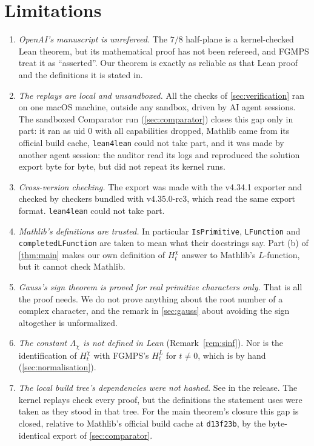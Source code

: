 \documentclass[11pt]{article}
\theoremstyle{definition}
\newcommand{\lean}[1]{\texttt{#1}}
\newcommand{\Lc}{\Lambda}
\begin{document}
\section{Limitations}\label{sec:limits}

\begin{enumerate}
\item \emph{OpenAI's manuscript is unrefereed.} The $7/8$ half-plane is a kernel-checked Lean theorem, but its mathematical proof has not been refereed, and FGMPS treat it as ``asserted''. Our theorem is exactly as reliable as that Lean proof and the definitions it is stated in.
\item \emph{The replays are local and unsandboxed.} All the checks of \cref{sec:verification} ran on one macOS machine, outside any sandbox, driven by AI agent sessions. The sandboxed Comparator run (\cref{sec:comparator}) closes this gap only in part: it ran as uid 0 with all capabilities dropped, Mathlib came from its official build cache, \lean{lean4lean} could not take part, and it was made by another agent session: the auditor read its logs and reproduced the solution export byte for byte, but did not repeat its kernel runs.
\item \emph{Cross-version checking.} The export was made with the v4.34.1 exporter and checked by checkers bundled with v4.35.0-rc3, which read the same export format. \lean{lean4lean} could not take part.
\item \emph{Mathlib's definitions are trusted.} In particular \lean{IsPrimitive}, \lean{LFunction} and \lean{completedLFunction} are taken to mean what their docstrings say. Part (b) of \cref{thm:main} makes our own definition of $H^\chi_t$ answer to Mathlib's $L$-function, but it cannot check Mathlib.
\item \emph{Gauss's sign theorem is proved for real primitive characters only.} That is all the proof needs. We do not prove anything about the root number of a complex character, and the remark in \cref{sec:gauss} about avoiding the sign altogether is unformalized.
\item \emph{The constant $\Lc_\chi$ is not defined in Lean} (Remark~\ref{rem:sinf}). Nor is the identification of $H^\chi_t$ with FGMPS's $H^L_t$ for $t \ne 0$, which is by hand (\cref{sec:normalisation}).
\item \emph{The local build tree's dependencies were not hashed.} See  in the release. The kernel replays check every proof, but the definitions the statement uses were taken as they stood in that tree. For the main theorem's closure this gap is closed, relative to Mathlib's official build cache at \lean{d13f23b}, by the byte-identical export of \cref{sec:comparator}.

\end{enumerate}
\end{document}
